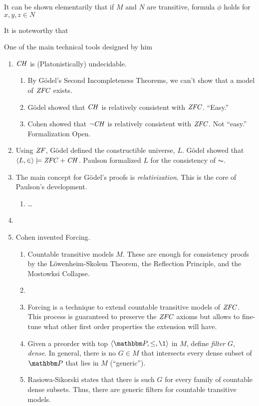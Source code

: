 It can be shown elementarily that if $M$ and $N$ are transitive,
formula $\phi$ holds for $x,y,z\in N$ 

It is noteworthy that 



 One of the main
technical tools designed by him 


  
\begin{enumerate}
\item $\mathit{CH}$ is (Platonistically) undecidable.
  \begin{enumerate}
  \item By G\"odel's Second Incompleteness Theorems, we can't show
    that a model of $\mathit{ZFC}$ exists.
  \item G\"odel showed that $\mathit{CH}$ is relatively consistent with
    $\mathit{ZFC}$. ``Easy.''
  \item Cohen showed that  $\neg\mathit{CH}$ is relatively consistent with
    $\mathit{ZFC}$. Not ``easy.'' Formalization Open.
  \end{enumerate}
\item Using $\mathit{ZF}$, G\"odel defined the constructible universe,
  $L$. G\"odel showed that $\langle L,\in\rangle\models \mathit{ZFC}+\mathit{CH}$. Paulson formalized $L$
  for the consistency of $\AC$.
\item The main concept for G\"odel's proofs is
  \emph{relativization}. This is the core of Paulson's development.
  \begin{enumerate}
  \item \dots
  \end{enumerate}
\item 
\item Cohen invented Forcing.
  \begin{enumerate}
  \item Countable transitive models $M$. These are enough for consistency
    proofs by the L\"owenheim-Skolem Theorem, the Reflection
    Principle, and the Mostowksi Collapse.
  \item 
  \item Forcing is a technique to extend countable transitive models of
    $\mathit{ZFC}$. This process is guaranteed to preserve the $\mathit{ZFC}$
    axioms but allows to fine-tune what other first order properties the
    extension will have. 
  \item Given a preorder with top $\lb\PP,\leq,\1\rb$ in $M$, define
    \emph{filter} $G$, \emph{dense}. In general, there is no  $G\in M$
    that intersects every dense
    subset of $\PP$ that lies in $M$ (``generic'').
  \item Rasiowa-Sikorski states that there is such $G$ for every
    family of countable dense subsets. Thus, there are generic filters
    for countable transitive models.
  \end{enumerate}

\end{enumerate}


